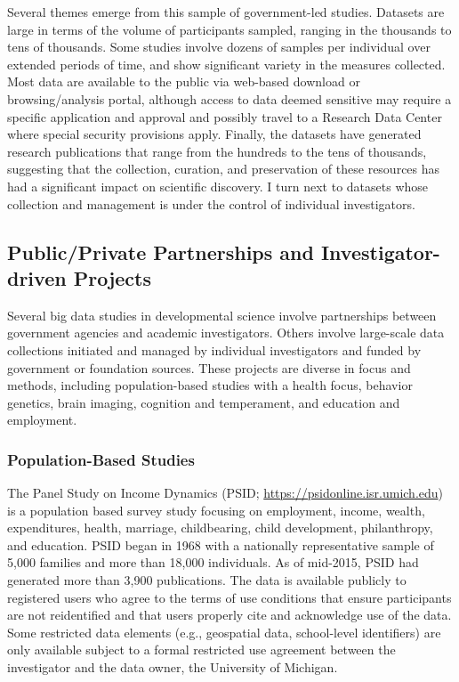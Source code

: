 \documentclass[letterpaper,man,apacite,natbib]{apa6}
\begin{document}
Several themes emerge from this sample of government-led studies.
Datasets are large in terms of the volume of participants sampled, ranging in the thousands to tens of thousands.
Some studies involve dozens of samples per individual over extended periods of time, and show significant variety in the measures collected.
Most data are available to the public via web-based download or browsing/analysis portal, although access to data deemed sensitive may require a specific application and approval and possibly travel to a Research Data Center where special security provisions apply.
Finally, the datasets have generated research publications that range from the hundreds to the tens of thousands, suggesting that the collection, curation, and preservation of these resources has had a significant impact on scientific discovery.
I turn next to datasets whose collection and management is under the control of individual investigators.
\subsection{Public/Private Partnerships and Investigator-driven Projects}
Several big data studies in developmental science involve partnerships between government agencies and academic investigators.
Others involve large-scale data collections initiated and managed by individual investigators and funded by government or foundation sources.
These projects are diverse in focus and methods, including population-based studies with a health focus, behavior genetics, brain imaging, cognition and temperament, and education and employment.
\subsubsection{Population-Based Studies}
The Panel Study on Income Dynamics (PSID; \url{https://psidonline.isr.umich.edu}) is a population based survey study focusing on employment, income, wealth, expenditures, health, marriage, childbearing, child development, philanthropy, and education.
PSID began in 1968 with a nationally representative sample of 5,000 families and more than 18,000 individuals.
As of mid-2015, PSID had generated more than 3,900 publications. 
The data is available publicly to registered users who agree to the terms of use conditions that ensure participants are not reidentified and that users properly cite and acknowledge use of the data. 
Some restricted data elements (e.g., geospatial data, school-level identifiers) are only available subject to a formal restricted use agreement between the investigator and the data owner, the University of Michigan.
\end{document}
